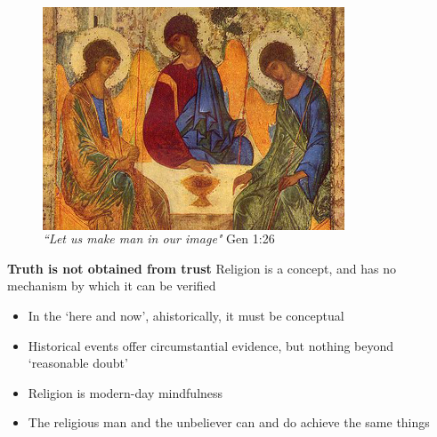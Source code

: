 \documentclass[xcolor=dvipsnames]{beamer}
\begin{document}
\begin{frame}[plain]
\begin{figure}
  \centering
  \begin{columns}
    \centering
    \includegraphics[width=0.8\textwidth,trim=0 0 0 0, clip]{holy-trinity}
    \caption {\emph{``Let us make man in our image"} Gen 1:26}
  \end{columns}
\end{figure}
\end{frame}


\begin{frame}[plain]
\textbf{Truth is not obtained from trust}\newline
Religion is a concept, and has no mechanism by which it can be verified \vspace{10mm}
\begin{itemize}
\item In the `here and now', ahistorically, it must be conceptual\vspace{5mm}
\item Historical events offer circumstantial evidence, but nothing beyond `reasonable doubt'\vspace{5mm}
\item Religion is modern-day mindfulness\vspace{5mm}
\item The religious man and the unbeliever can and do achieve the same things\vspace{5mm}
\end{itemize}
\end{frame}
\end{document}

